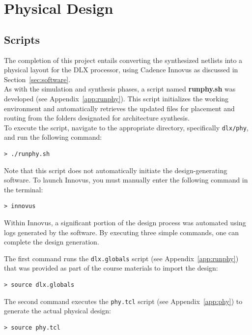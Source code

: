 \chapter{Physical Design}
\label{chap:07_physical_design}

\section{Scripts}
\label{sec:phy_scripts}

The completion of this project entails converting the synthesized netlists into a physical layout for the DLX processor, using Cadence Innovus as discussed in Section~\ref{sec:software}. \\

As with the simulation and synthesis phases, a script named \textbf{runphy.sh} was developed (see Appendix~\ref{app:runphy}). This script initializes the working environment and automatically retrieves the updated files for placement and routing from the folders designated for architecture synthesis. \\

To execute the script, navigate to the appropriate directory, specifically \texttt{dlx/phy}, and run the following command:
\begin{lstlisting}[style=MyShell]
 > ./runphy.sh
\end{lstlisting}

Note that this script does not automatically initiate the design-generating software. To launch Innovus, you must manually enter the following command in the terminal:
\begin{lstlisting}[style=MyShell]
 > innovus
\end{lstlisting}

Within Innovus, a significant portion of the design process was automated using logs generated by the software. By executing three simple commands, one can complete the design generation.

The first command runs the \texttt{dlx.globals} script (see Appendix~\ref{app:runphy}) that was provided as part of the course materials to import the design:
\begin{lstlisting}[style=MyShell]
 > source dlx.globals
\end{lstlisting}

The second command executes the \texttt{phy.tcl} script (see Appendix~\ref{app:phy}) to generate the actual physical design:
\begin{lstlisting}[style=MyShell]
 > source phy.tcl
\end{lstlisting}

